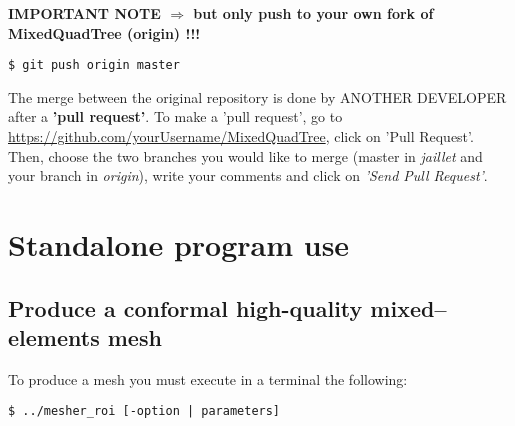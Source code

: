 \documentclass[10pt]{article}
\begin{document}
\textbf{IMPORTANT NOTE $\Rightarrow$ but only push to your own fork of MixedQuadTree (origin) !!!}

\begin{tcolorbox}\begin{verbatim}
$ git push origin master
\end{verbatim}
\end{tcolorbox}

The merge between the original repository is done by ANOTHER DEVELOPER after a \textbf{'pull request'}.
To make a 'pull request', go to \url{https://github.com/yourUsername/MixedQuadTree}, click on 'Pull Request'. Then, choose the two branches you would like to merge (master in \textit{jaillet} and your branch in \textit{origin}), write your comments and click on \textit{'Send Pull Request'}.


\section{Standalone program use}
\label{standalone}

\subsection{Produce a conformal high-quality mixed--elements mesh}
\label{s:generatemesh}

To produce a mesh you must execute in a terminal the following:
%
\begin{tcolorbox}
{\small
\begin{verbatim}
$ ../mesher_roi [-option | parameters]
\end{verbatim}
}\end{tcolorbox}
\end{document}
